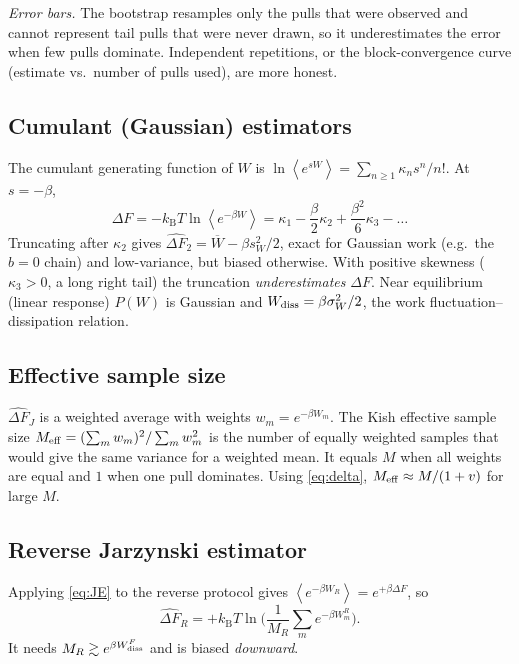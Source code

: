 \documentclass[11pt,a4paper]{article}
\newcommand{\kT}{k_{\mathrm B}T}
\newcommand{\avg}[1]{\left\langle #1\right\rangle}
\newcommand{\Wd}{W_{\rm diss}}
\newcommand{\dFJ}{\widehat{\Delta F}_J}
\begin{document}
\emph{Error bars.} The bootstrap resamples only the pulls that were observed and cannot represent
tail pulls that were never drawn, so it underestimates the error when few pulls dominate. Independent
repetitions, or the block-convergence curve (estimate vs.\ number of pulls used), are more honest.

\subsection{Cumulant (Gaussian) estimators}
The cumulant generating function of $W$ is $\ln\avg{e^{sW}}=\sum_{n\ge1}\kappa_ns^n/n!$. At $s=-\beta$,
\begin{equation}
\Delta F=-\kT\ln\avg{e^{-\beta W}}=\kappa_1-\frac{\beta}{2}\kappa_2+\frac{\beta^2}{6}\kappa_3-\dots
\end{equation}
Truncating after $\kappa_2$ gives $\widehat{\Delta F}_2=\overline W-\beta s_W^2/2$, exact for Gaussian
work (e.g.\ the $b=0$ chain) and low-variance, but biased otherwise. With positive skewness
($\kappa_3>0$, a long right tail) the truncation \emph{underestimates} $\Delta F$. Near equilibrium
(linear response) $P(W)$ is Gaussian and $\Wd=\beta\sigma_W^2/2$, the work fluctuation--dissipation relation.

\subsection{Effective sample size}
$\dFJ$ is a weighted average with weights $w_m=e^{-\beta W_m}$. The Kish effective sample size
$M_{\rm eff}=(\sum_mw_m)^2/\sum_mw_m^2$ is the number of equally weighted samples that would give the
same variance for a weighted mean. It equals $M$ when all weights are equal and $1$ when one pull
dominates. Using \eqref{eq:delta}, $M_{\rm eff}\approx M/(1+v)$ for large $M$.

\subsection{Reverse Jarzynski estimator}
Applying \eqref{eq:JE} to the reverse protocol gives $\avg{e^{-\beta W_R}}=e^{+\beta\Delta F}$, so
\begin{equation}
\widehat{\Delta F}_R=+\kT\ln\Big(\frac1{M_R}\sum_m e^{-\beta W^R_m}\Big).
\end{equation}
It needs
$M_R\gtrsim e^{\beta\Wd^F}$ and is biased \emph{downward}.
\end{document}
